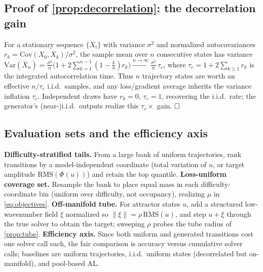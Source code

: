 \documentclass{article}
\theoremstyle{plain}
\theoremstyle{definition}
\theoremstyle{remark}
\newcommand{\state}{u}
\newcommand{\sol}{\Phi}
\begin{document}
\subsection{Proof of \cref{prop:decorrelation}: the decorrelation gain}\label{app:decorrelation}
For a stationary sequence $\{X_i\}$ with variance $\sigma^2$ and normalized autocovariances
$r_k=\mathrm{Cov}(X_0,X_k)/\sigma^2$, the sample mean over $n$ consecutive states has variance
$\mathrm{Var}(\bar X_n)=\tfrac{\sigma^2}{n}\bigl(1+2\sum_{k=1}^{n-1}(1-\tfrac{k}{n})r_k\bigr)
\xrightarrow{n\to\infty}\tfrac{\sigma^2}{n}\,\tau_c$, where $\tau_c=1+2\sum_{k\ge1}r_k$ is the integrated
autocorrelation time. Thus $n$ trajectory states are worth an effective $n/\tau_c$ i.i.d.\ samples, and any
loss/gradient average inherits the variance inflation $\tau_c$. Independent draws have $r_k=0$, $\tau_c=1$,
recovering the i.i.d.\ rate; the generator's (near-)i.i.d.\ outputs realize this $\tau_c\times$ gain.
$\hfill\square$

\subsection{Evaluation sets and the efficiency axis}\label{app:protocol}
\textbf{Difficulty-stratified tails.} From a large bank of uniform trajectories, rank transitions by a
model-independent coordinate (total variation of $\state$, or target amplitude $\mathrm{RMS}(\sol(\state))$)
and retain the top quantile. \textbf{Loss-uniform coverage set.} Resample the bank to place equal mass in
each difficulty-coordinate bin (uniform over difficulty, not occupancy), realizing $\mu$ in
\eqref{eq:objectives}. \textbf{Off-manifold tube.} For attractor states $\state$, add a structured
low-wavenumber field $\xi$ normalized so $\|\xi\|=\rho\,\mathrm{RMS}(\state)$, and step $\state+\xi$
through the true solver to obtain the target; sweeping $\rho$ probes the tube radius of
\cref{prop:tube}. \textbf{Efficiency axis.} Since both uniform and generated transitions cost one solver
call each, the fair comparison is accuracy versus cumulative solver calls; baselines are uniform
trajectories, i.i.d.\ uniform states (decorrelated but on-manifold), and pool-based AL.



\end{document}
